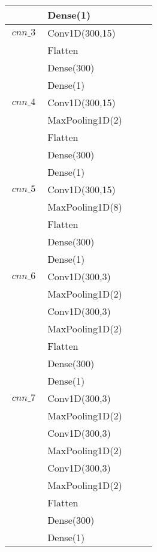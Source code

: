 \begin{longtable}{| c | m{0.58\linewidth} | r | m{0.1\linewidth} |}
                & Dense(1)                      \\ \hline
    $cnn\_3$    & Conv1D(300,15)                \\
                & Flatten                       \\
                & Dense(300)                    \\
                & Dense(1)                      \\ \hline
    $cnn\_4$    & Conv1D(300,15)                \\
                & MaxPooling1D(2)               \\
                & Flatten                       \\
                & Dense(300)                    \\
                & Dense(1)                      \\ \hline
    $cnn\_5$    & Conv1D(300,15)                \\
                & MaxPooling1D(8)               \\
                & Flatten                       \\
                & Dense(300)                    \\
                & Dense(1)                      \\ \hline
    $cnn\_6$    & Conv1D(300,3)                 \\
                & MaxPooling1D(2)               \\
                & Conv1D(300,3)                 \\
                & MaxPooling1D(2)               \\
                & Flatten                       \\
                & Dense(300)                    \\
                & Dense(1)                      \\ \hline

    $cnn\_7$    & Conv1D(300,3)                 \\
                & MaxPooling1D(2)               \\
                & Conv1D(300,3)                 \\
                & MaxPooling1D(2)               \\
                & Conv1D(300,3)                 \\
                & MaxPooling1D(2)               \\
                & Flatten                       \\
                & Dense(300)                    \\
                & Dense(1)                      \\ \hline


\end{longtable}
